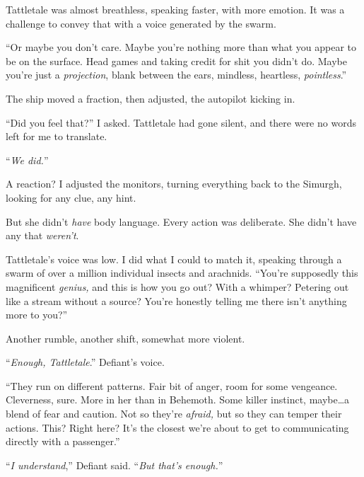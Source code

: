 Tattletale was almost breathless, speaking faster, with more emotion.  It was a challenge to convey that with a voice generated by the swarm.



``Or maybe you don't care.  Maybe you're nothing more than what you appear to be on the surface.  Head games and taking credit for shit you didn't do.  Maybe you're just a \emph{projection}, blank between the ears, mindless, heartless, \emph{pointless}.''



The ship moved a fraction, then adjusted, the autopilot kicking in.



``Did you feel that?''  I asked.  Tattletale had gone silent, and there were no words left for me to translate.



``\emph{We did.}''



A reaction?  I adjusted the monitors, turning everything back to the Simurgh, looking for any clue, any hint.



But she didn't \emph{have} body language.  Every action was deliberate.  She didn't have any that \emph{weren't}.



Tattletale's voice was low.  I did what I could to match it, speaking through a swarm of over a million individual insects and arachnids.  ``You're supposedly this magnificent \emph{genius, }and this is how you go out?  With a whimper?  Petering out like a stream without a source?  You're honestly telling me there isn't anything more to you?''



Another rumble, another shift, somewhat more violent.



``\emph{Enough, Tattletale}.''  Defiant's voice.



``They run on different patterns.  Fair bit of anger, room for some vengeance.  Cleverness, sure.  More in her than in Behemoth.  Some killer instinct, maybe\ldots a blend of fear and caution.  Not so they're \emph{afraid, }but so they can temper their actions.  This?  Right here?  It's the closest we're about to get to communicating directly with a passenger.''



``\emph{I understand},'' Defiant said.  ``\emph{But that's enough.}''



